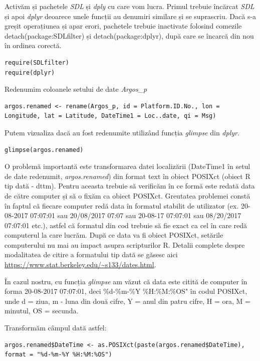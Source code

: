 \documentclass[11pt,onehalfspacing]{elife}
\begin{document}
Activăm și pachetele \textit{SDL} și \textit{dply} cu care vom lucra. Primul trebuie încărcat \textit{SDL} și apoi \textit{dplyr} deoarece unele funcții au denumiri similare și se suprascriu. Dacă s-a greșit operațiunea și apar erori, pachetele trebuie inactivate folosind comezile detach(package:SDLfilter) și detach(package:dplyr), după care se încarcă din nou în ordinea corectă.
\begin{lstlisting}
require(SDLfilter)
require(dplyr)
\end{lstlisting}

Redenumim coloanele setului de date \textit{Argos\_p}
\begin{lstlisting}
argos.renamed <- rename(Argos_p, id = Platform.ID.No., lon = Longitude, lat = Latitude, DateTime1 = Loc..date, qi = Msg)
\end{lstlisting}

Putem vizualiza dacă au fost redenumite utilizând funcția \textit{glimpse} din \textit{dplyr}.
\begin{lstlisting}
glimpse(argos.renamed)
\end{lstlisting}

O problemă importantă este transformarea datei localizării (DateTime1 în setul de date redenumit, \textit{argos.renamed}) din format text în obiect POSIXct (obiect R tip dată - dttm). Pentru aceasta trebuie să verificăm în ce formă este redată data de către computer și să o fixăm ca obiect POSIXct. Greutatea problemei constă în faptul că fiecare computer redă data în formatul stabilit de utilizator (ex. 20-08-2017 07:07:01 sau 20/08/2017 07:07 sau 20-08-17 07:07:01 sau 08/20/2017 07:07:01 etc.), astfel că formatul din cod trebuie să fie exact ca cel în care redă computerul la care lucrăm. După ce data va fi obiect POSIXct, setările computerului nu mai au impact asupra scripturilor R. Detalii complete despre modalitatea de citire a formatului tip dată se găsesc aici \url{https://www.stat.berkeley.edu/~s133/dates.html}.

În cazul nostru, cu funcția \textit{glimpse} am văzut că data este citită de computer în forma 20-08-2017 07:07:01, deci \%d-\%m-\%Y \%H:\%M:\%OS" în codul POSIXct, unde d = ziua, m - luna din două cifre, Y = anul din patru cifre, H = ora, M = minutul, OS = secunda.

Transformăm câmpul dată astfel:
\begin{lstlisting}
argos.renamed$DateTime <- as.POSIXct(paste(argos.renamed$DateTime), format = "%d-%m-%Y %H:%M:%OS")
\end{lstlisting}
\end{document}
